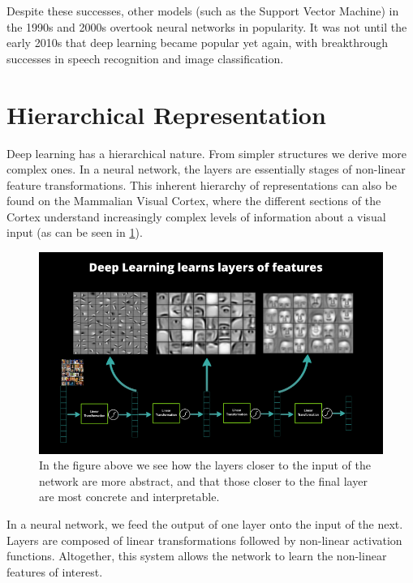 Despite these successes, other models (such as the Support Vector Machine) in the 1990s and 2000s overtook neural networks in popularity.
It was not until the early 2010s that deep learning became popular yet again, with breakthrough successes in speech recognition and image classification.

\section{Hierarchical Representation}\label{ssec:hierarchical-representation}

Deep learning has a hierarchical nature.
From simpler structures we derive more complex ones.
In a neural network, the layers are essentially stages of non-linear feature transformations.
This inherent hierarchy of representations can also be found on the Mammalian Visual Cortex, where the different sections of the Cortex understand increasingly complex levels of information about a visual input (as can be seen in \cref{fig:deep-learning-hierarchical-features}).

\begin{figure}[ht]
\centering
\includegraphics[width=0.85\linewidth]{figs/dl_features.png}
\caption{In the figure above we see how the layers closer to the input of the network are more abstract, and that those closer to the final layer are most concrete and interpretable.}
\label{fig:deep-learning-hierarchical-features}
\end{figure}

In a neural network, we feed the output of one layer onto the input of the next.
Layers are composed of linear transformations followed by non-linear activation functions.
Altogether, this system allows the network to learn the non-linear features of interest.

